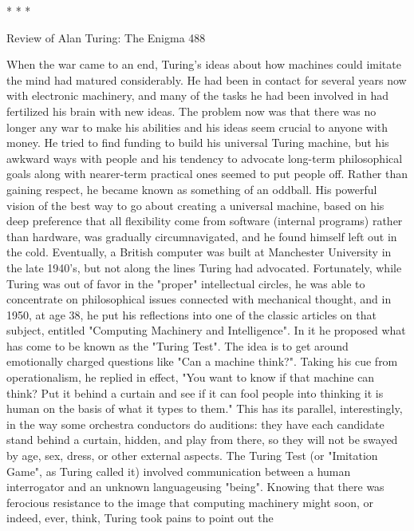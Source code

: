                                        *   *   *




Review of Alan Turing: The Enigma                                                   488

         When the war came to an end, Turing's ideas about how machines could
imitate the mind had matured considerably. He had been in contact for several years
now with electronic machinery, and many of the tasks he had been involved in had
fertilized his brain with new ideas. The problem now was that there was no longer any
war to make his abilities and his ideas seem crucial to anyone with money. He tried to
find funding to build his universal Turing machine, but his awkward ways with people
and his tendency to advocate long-term philosophical goals along with nearer-term
practical ones seemed to put people off. Rather than gaining respect, he became
known as something of an oddball. His powerful vision of the best way to go about
creating a universal machine, based on his deep preference that all flexibility come
from software (internal programs) rather than hardware, was gradually
circumnavigated, and he found himself left out in the cold. Eventually, a British
computer was built at Manchester University in the late 1940's, but not along the lines
Turing had advocated.
         Fortunately, while Turing was out of favor in the "proper" intellectual circles,
he was able to concentrate on philosophical issues connected with mechanical
thought, and in 1950, at age 38, he put his reflections into one of the classic articles on
that subject, entitled "Computing Machinery and Intelligence". In it he proposed what
has come to be known as the "Turing Test". The idea is to get around emotionally
charged questions like "Can a machine think?". Taking his cue from operationalism,
he replied in effect, "You want to know if that machine can think? Put it behind a
curtain and see if it can fool people into thinking it is human on the basis of what it
types to them." This has its parallel, interestingly, in the way some orchestra
conductors do auditions: they have each candidate stand behind a curtain, hidden, and
play from there, so they will not be swayed by age, sex, dress, or other external
aspects.
         The Turing Test (or "Imitation Game", as Turing called it) involved
communication between a human interrogator and an unknown languageusing
"being". Knowing that there was ferocious resistance to the image that computing
machinery might soon, or indeed, ever, think, Turing took pains to point out the
